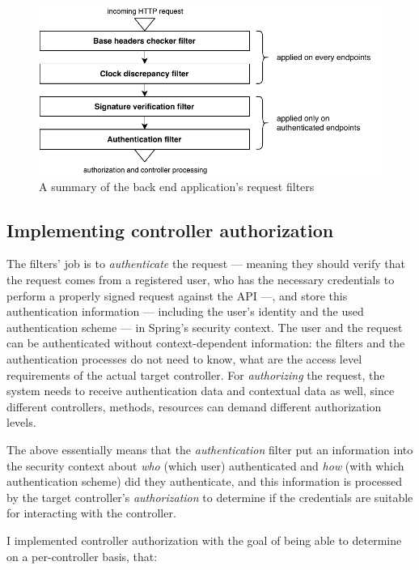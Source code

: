 \begin{figure}[!htb]
    \centering
    \includegraphics[width=\textwidth-2cm]{figures/request-filters.pdf}
    \caption{A summary of the back end application's request filters}
    \label{fig:request-filters}
\end{figure}

\subsection{Implementing controller authorization}

The filters' job is to \emph{authenticate} the request — meaning they should verify that the request comes from a registered user, who has the necessary credentials to perform a properly signed request against the API —, and store this authentication information — including the user's identity and the used authentication scheme — in Spring's security context. The user and the request can be authenticated without context-dependent information: the filters and the authentication processes do not need to know, what are the access level requirements of the actual target controller. For \emph{authorizing} the request, the system needs to receive authentication data and contextual data as well, since different controllers, methods, resources can demand different authorization levels.

The above essentially means that the \emph{authentication} filter put an information into the security context about \emph{who} (which user) authenticated and \emph{how} (with which authentication scheme) did they authenticate, and this information is processed by the target controller's \emph{authorization} to determine if the credentials are suitable for interacting with the controller.

I implemented controller authorization with the goal of being able to determine on a per-controller basis, that:

